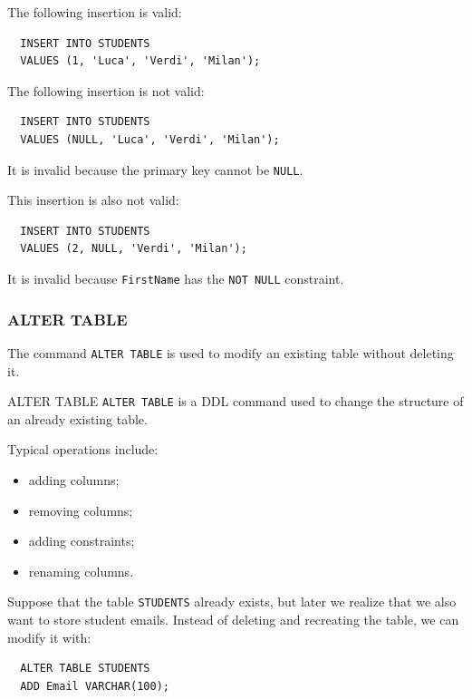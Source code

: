 \pagebreak

 \begin{example}
  The following insertion is valid:
  \begin{verbatim}
  INSERT INTO STUDENTS
  VALUES (1, 'Luca', 'Verdi', 'Milan');
  \end{verbatim}

  The following insertion is not valid:
  \begin{verbatim}
  INSERT INTO STUDENTS
  VALUES (NULL, 'Luca', 'Verdi', 'Milan');
  \end{verbatim}

  \vspace{-0.25cm}
  It is invalid because the primary key cannot be \texttt{NULL}.

  This insertion is also not valid:
  \begin{verbatim}
  INSERT INTO STUDENTS
  VALUES (2, NULL, 'Verdi', 'Milan');
  \end{verbatim}

  \vspace{-0.25cm}
  It is invalid because \texttt{FirstName} has the \texttt{NOT NULL} constraint.
 \end{example}

 \subsubsection{ALTER TABLE}

 The command \texttt{ALTER TABLE} is used to modify an existing table without deleting it.

 \begin{defbox}{ALTER TABLE}
  \texttt{ALTER TABLE} is a DDL command used to change the structure of an already existing table.
 \end{defbox}

 Typical operations include:
 \begin{itemize}
  \item adding columns;
  \item removing columns;
  \item adding constraints;
  \item renaming columns.
 \end{itemize}

 \vs
 \begin{example}
  Suppose that the table \texttt{STUDENTS} already exists, but later we realize that we also want to store student emails. Instead of deleting and recreating the table, we can modify it with:
  \begin{verbatim}
  ALTER TABLE STUDENTS
  ADD Email VARCHAR(100);
  \end{verbatim}
 \end{example}


